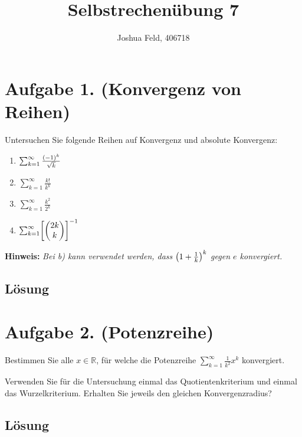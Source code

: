 \documentclass[german,12pt]{homework}
\title{Selbstrechenübung 7}
\author{Joshua Feld, 406718}
\institute{RWTH Aachen University\\Center for Computational Engineering Science}
\newcommand{\RR}{\mathbb{R}}
\DeclarePairedDelimiter{\enbrace}{(}{)}
\DeclarePairedDelimiter{\benbrace}{[}{]}
\begin{document}
    \maketitle

    \section*{Aufgabe 1. (Konvergenz von Reihen)}

    \begin{problem}
        Untersuchen Sie folgende Reihen auf Konvergenz und absolute Konvergenz:
        \begin{enumerate}
            \item \(\sum_{k = 1}^\infty\frac{\enbrace*{-1}^k}{\sqrt{k}}\)
            \item \(\sum_{k = 1}^\infty\frac{k!}{k^k}\)
            \item \(\sum_{k = 1}^\infty\frac{k^2}{2^k}\)
            \item \(\sum_{k = 1}^\infty\benbrace*{\begin{pmatrix}2k\\k
            \end{pmatrix}}^{-1}\)
        \end{enumerate}

        \textbf{Hinweis:} \quad \emph{Bei b) kann verwendet werden, dass
        \(\enbrace*{1 + \frac{1}{k}}^k\) gegen \(e\) konvergiert.}
    \end{problem}

    \subsection*{Lösung}

    \section*{Aufgabe 2. (Potenzreihe)}

    \begin{problem}
        Bestimmen Sie alle \(x \in \RR\), für welche die Potenzreihe
        \(\sum_{k = 1}^\infty\frac{1}{k^2}x^k\) konvergiert.

        Verwenden Sie für die Untersuchung einmal das Quotientenkriterium und
        einmal das Wurzelkriterium. Erhalten Sie jeweils den gleichen
        Konvergenzradius?
    \end{problem}

    \subsection*{Lösung}
\end{document}
